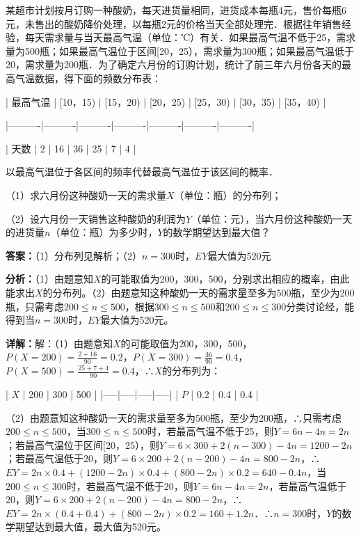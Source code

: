 \begin{question}[points=12]
某超市计划按月订购一种酸奶，每天进货量相同，进货成本每瓶4元，售价每瓶6元，未售出的酸奶降价处理，以每瓶2元的价格当天全部处理完．根据往年销售经验，每天需求量与当天最高气温（单位：℃）有关．如果最高气温不低于25，需求量为500瓶；如果最高气温位于区间[20，25），需求量为300瓶；如果最高气温低于20，需求量为200瓶．为了确定六月份的订购计划，统计了前三年六月份各天的最高气温数据，得下面的频数分布表：



| 最高气温 | [10，15) | [15，20) | [20，25) | [25，30) | [30，35) | [35，40) |

|----------|----------|----------|----------|----------|----------|----------|

| 天数     | 2        | 16       | 36       | 25       | 7        | 4        |



以最高气温位于各区间的频率代替最高气温位于该区间的概率．

（1）求六月份这种酸奶一天的需求量$X$（单位：瓶）的分布列；

（2）设六月份一天销售这种酸奶的利润为$Y$（单位：元），当六月份这种酸奶一天的进货量$n$（单位：瓶）为多少时，$Y$的数学期望达到最大值？
\begin{solution}
\textbf{答案：}（1）分布列见解析；（2）$n=300$时，$EY$最大值为$520$元

\textbf{分析：}（1）由题意知$X$的可能取值为200，300，500，分别求出相应的概率，由此能求出$X$的分布列。（2）由题意知这种酸奶一天的需求量至多为500瓶，至少为200瓶，只需考虑$200\le n\le 500$，根据$300\le n\le 500$和$200\le n\le 300$分类讨论经，能得到当$n=300$时，$EY$最大值为520元。

\textbf{详解：}解：（1）由题意知$X$的可能取值为200，300，500，$P(X=200)=\frac{2+16}{90}=0.2$，$P(X=300)=\frac{36}{90}=0.4$，$P(X=500)=\frac{25+7+4}{90}=0.4$，∴$X$的分布列为：

| $X$ | 200 | 300 | 500 |
|-----|-----|-----|-----|
| $P$ | 0.2 | 0.4 | 0.4 |

（2）由题意知这种酸奶一天的需求量至多为500瓶，至少为200瓶，∴只需考虑$200\le n\le 500$，当$300\le n\le 500$时，若最高气温不低于25，则$Y=6n-4n=2n$；若最高气温位于区间[20，25），则$Y=6\times300+2(n-300)-4n=1200-2n$；若最高气温低于20，则$Y=6\times200+2(n-200)-4n=800-2n$，∴$EY=2n\times0.4+(1200-2n)\times0.4+(800-2n)\times0.2=640-0.4n$，当$200\le n\le 300$时，若最高气温不低于20，则$Y=6n-4n=2n$，若最高气温低于20，则$Y=6\times200+2(n-200)-4n=800-2n$，∴$EY=2n\times(0.4+0.4)+(800-2n)\times0.2=160+1.2n$．∴$n=300$时，$Y$的数学期望达到最大值，最大值为520元。
\end{solution}
\end{question}

